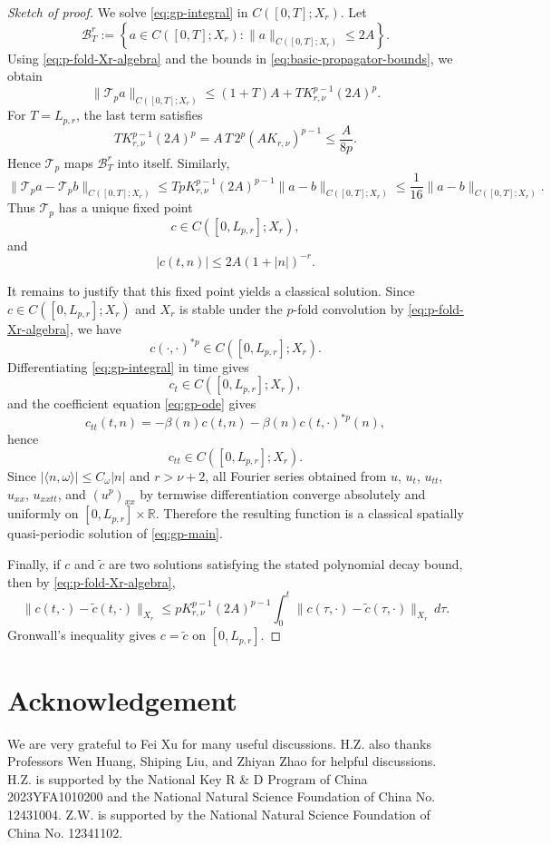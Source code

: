 \documentclass[12pt,reqno,tbtags]{amsart}
\newcommand\1{\mathbbm{1}}
\begin{document}
\begin{proof}[Sketch of proof]
We solve \eqref{eq:gp-integral} in $C([0,T];X_r)$. Let
\[
\mathcal B_T^r
:=
\left\{
a\in C([0,T];X_r):
\|a\|_{C([0,T];X_r)}\le2A
\right\}.
\]
Using \eqref{eq:p-fold-Xr-algebra} and the bounds in
\eqref{eq:basic-propagator-bounds}, we obtain
\[
\|\mathcal T_p a\|_{C([0,T];X_r)}
\le
(1+T)A
+
T K_{r,\nu}^{p-1}(2A)^p .
\]
For $T=L_{p,r}$, the last term satisfies
\[
T K_{r,\nu}^{p-1}(2A)^p
=
A\,T\,2^p(AK_{r,\nu})^{p-1}
\le
\frac{A}{8p}.
\]
Hence $\mathcal T_p$ maps $\mathcal B_T^r$ into itself. Similarly,
\[
\|\mathcal T_p a-\mathcal T_p b\|_{C([0,T];X_r)}
\le
TpK_{r,\nu}^{p-1}(2A)^{p-1}
\|a-b\|_{C([0,T];X_r)}
\le
\frac1{16}
\|a-b\|_{C([0,T];X_r)}.
\]
Thus $\mathcal T_p$ has a unique fixed point
\[
c\in C([0,L_{p,r}];X_r),
\]
and
\[
|c(t,n)|\le2A(1+|n|)^{-r}.
\]

It remains to justify that this fixed point yields a classical solution. Since
$c\in C([0,L_{p,r}];X_r)$ and $X_r$ is stable under the $p$-fold convolution by
\eqref{eq:p-fold-Xr-algebra}, we have
\[
c(\cdot,\cdot)^{*p}\in C([0,L_{p,r}];X_r).
\]
Differentiating \eqref{eq:gp-integral} in time gives
\[
c_t\in C([0,L_{p,r}];X_r),
\]
and the coefficient equation \eqref{eq:gp-ode} gives
\[
c_{tt}(t,n)
=
-\beta(n)c(t,n)-\beta(n)c(t,\cdot)^{*p}(n),
\]
hence
\[
c_{tt}\in C([0,L_{p,r}];X_r).
\]
Since $|\langle n,\omega\rangle|\le C_\omega |n|$ and $r>\nu+2$, all Fourier
series obtained from $u$, $u_t$, $u_{tt}$, $u_{xx}$, $u_{xxtt}$, and $(u^p)_{xx}$
by termwise differentiation converge absolutely and uniformly on
$[0,L_{p,r}]\times\mathbb R$. Therefore the resulting function is a classical
spatially quasi-periodic solution of \eqref{eq:gp-main}.

Finally, if $c$ and $\widetilde c$ are two solutions satisfying the stated polynomial
decay bound, then by \eqref{eq:p-fold-Xr-algebra},
\[
\|c(t,\cdot)-\widetilde c(t,\cdot)\|_{X_r}
\le
pK_{r,\nu}^{p-1}(2A)^{p-1}
\int_0^t
\|c(\tau,\cdot)-\widetilde c(\tau,\cdot)\|_{X_r}\,d\tau .
\]
Gronwall's inequality gives $c=\widetilde c$ on $[0,L_{p,r}]$.
\end{proof}




















\section*{Acknowledgement}
We are very grateful to Fei Xu for many useful discussions. H.Z. also thanks Professors Wen Huang, Shiping Liu, and Zhiyan Zhao for helpful discussions. H.Z. is supported by the National Key R \& D Program of China 2023YFA1010200 and the
 National Natural Science Foundation of China No. 12431004. Z.W. is supported by the National Natural Science Foundation of China No. 12341102.
\end{document}
